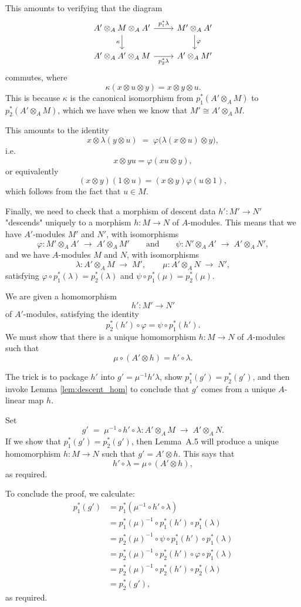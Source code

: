 \documentclass[12pt]{article}
\begin{document}
This amounts to verifying that the diagram
\[
\begin{tikzcd}
A' \otimes_A M \otimes_A A' 
  \arrow[r, "p_1^* \lambda"] \arrow[d, "\kappa"'] 
& M' \otimes_A A' 
  \arrow[d, "\varphi"] \\
A' \otimes_A A' \otimes_A M 
  \arrow[r, "p_2^* \lambda"'] 
& A' \otimes_A M'
\end{tikzcd}
\]
commutes, where 
\[
\kappa(x \otimes u \otimes y) = x \otimes y \otimes u.
\]
This is because $\kappa$ is the canonical isomorphism from $p_1^*(A' \otimes_A M)$ to $p_2^*(A' \otimes_A M)$, which we have when we know that $M' \cong A' \otimes_A M$.

This amounts to the identity
\[
x \otimes \lambda(y \otimes u) 
\;=\; \varphi\!\bigl(\lambda(x \otimes u) \otimes y \bigr),
\]
i.e.
\[
x \otimes yu = \varphi(xu \otimes y),
\]
or equivalently
\[
(x \otimes y)(1 \otimes u) = (x \otimes y)\varphi(u \otimes 1),
\]
which follows from the fact that $u \in M$.

Finally, we need to check that a morphism of descent data $h': M' \to N'$ "descends" uniquely to a morphism $h: M \to N$ of $A$-modules. This means that we have $A'$-modules $M'$ and $N'$, with isomorphisms
\[
\varphi : M' \otimes_A A' \;\to\; A' \otimes_A M' 
\qquad\text{and}\qquad
\psi : N' \otimes_A A' \;\to\; A' \otimes_A N',
\]
and we have $A$-modules $M$ and $N$, with isomorphisms 
\[
\lambda : A' \otimes_A M \;\to\; M', 
\qquad
\mu : A' \otimes_A N \;\to\; N',
\]
satisfying $\varphi \circ p_1^*(\lambda) = p_2^*(\lambda)$ and 
$\psi \circ p_1^*(\mu) = p_2^*(\mu)$. 

We are given a homomorphism 
\[
h' : M' \to N'
\]
of $A'$-modules, satisfying the identity 
\[
p_2^*(h') \circ \varphi = \psi \circ p_1^*(h').
\]
We must show that there is a unique homomorphism $h : M \to N$ of $A$-modules such that 
\[
\mu \circ (A' \otimes h) = h' \circ \lambda.
\]

The trick is to package $h'$ into $g' = \mu^{-1} h' \lambda$, show $p_1^*(g') = p_2^*(g')$, and then invoke Lemma \ref{lem:descent_hom} to conclude that $g'$ comes from a unique $A$-linear map $h$.

Set 
\[
g' \;=\; \mu^{-1} \circ h' \circ \lambda : A' \otimes_A M \;\to\; A' \otimes_A N.
\]
If we show that $p_1^*(g') = p_2^*(g')$, then Lemma~A.5 will produce a unique homomorphism 
$h : M \to N$ such that $g' = A' \otimes h$. 
This says that 
\[
h' \circ \lambda = \mu \circ (A' \otimes h),
\]
as required. 

To conclude the proof, we calculate:
\begin{align*}
p_1^*(g') 
&= p_1^*(\mu^{-1} \circ h' \circ \lambda) \\
&= p_1^*(\mu)^{-1} \circ p_1^*(h') \circ p_1^*(\lambda) \\
&= p_2^*(\mu)^{-1} \circ \psi \circ p_1^*(h') \circ p_1^*(\lambda) \\
&= p_2^*(\mu)^{-1} \circ p_2^*(h') \circ \varphi \circ p_1^*(\lambda) \\
&= p_2^*(\mu)^{-1} \circ p_2^*(h') \circ p_2^*(\lambda) \\
&= p_2^*(g'),
\end{align*}
as required.
\end{document}
